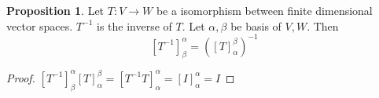 \documentclass{article}
\theoremstyle{definition}
\newtheorem{proposition}[theorem]{Proposition}
\theoremstyle{remark}
\begin{document}
\begin{proposition}
    Let $T:V\rightarrow W$ be a isomorphism between finite dimensional vector spaces.
    $T^{-1}$ is the inverse of $T$.
    Let $\alpha,\beta$ be basis of $V,W$.
    Then 
    \[
    [T^{-1}]_{\beta}^{\alpha}=([T]_{\alpha}^{\beta})^{-1}
    \]
\end{proposition}

\begin{proof}
    $[T^{-1}]_{\beta}^{\alpha}[T]_{\alpha}^{\beta}=[T^{-1}T]_{\alpha}^{\alpha}=[I]_{\alpha}^{\alpha}=I$
\end{proof}
\end{document}
